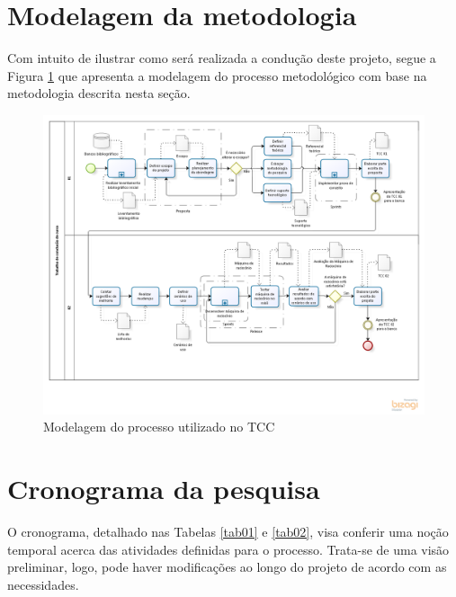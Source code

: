 \section{Modelagem da metodologia}
Com intuito de ilustrar como será realizada a condução deste projeto, segue a
Figura \ref{modelagem} que apresenta a modelagem do processo metodológico com base na metodologia
descrita nesta seção.

\FloatBarrier
\begin{figure}[!h]
\centering
\includegraphics[keepaspectratio=true,scale=0.5]{figuras/modelagemTcc.png}
\caption{Modelagem do processo utilizado no TCC}
\label{modelagem}
\end{figure}
\clearpage
 
\section{Cronograma da pesquisa}
O cronograma, detalhado nas Tabelas \ref{tab01} e \ref{tab02}, visa conferir uma noção temporal acerca das atividades definidas para o processo. Trata-se de uma visão preliminar, logo, pode haver modificações ao longo do projeto de acordo com as necessidades.      

